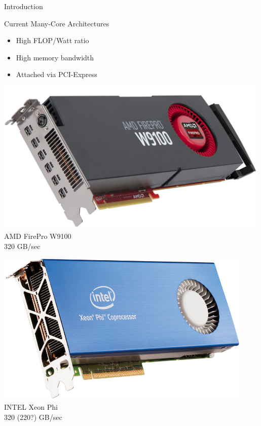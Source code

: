 
\begin{frame}{Introduction}
  \begin{block}{Current Many-Core Architectures}
    \begin{itemize}
     \item High FLOP/Watt ratio
     \item High memory bandwidth
     \item Attached via PCI-Express
    \end{itemize}
\vspace*{1cm}
  \end{block}

   \begin{minipage}{0.3\textwidth}
    \begin{center}
     \includegraphics[width=0.99\textwidth]{figures/w9100.jpg} \\ AMD FirePro W9100 \\ 320 GB/sec
    \end{center}
   \end{minipage}
   \hspace{0.2cm}
%
   \begin{minipage}{0.3\textwidth}
    \begin{center}
     \includegraphics[width=0.92\textwidth]{figures/xeon-phi.jpg} \\ INTEL Xeon Phi \\ 320 (220?) GB/sec

\end{center}
\end{minipage}
\end{frame}
